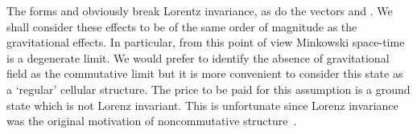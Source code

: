 \documentclass[a4paper,12pt]{article}
\def\h#1{\hat #1}
\begin{document}
The forms \coordHE{} and \myHighlight{$\h{K}_{ab}$}\coordHE{} obviously break Lorentz
invariance, as do the vectors \coordHE{} and
\myHighlight{$\h{F}_a = \epsilon_{abcd} \h{F^}{bcd}$}\coordHE{}. We shall consider these
effects to be of the same order of magnitude as the gravitational
effects. In particular, from this point of view Minkowski space-time
is a degenerate limit. We would prefer to identify the absence of
gravitational field as the commutative limit but it is more convenient
to consider this state as a `regular' cellular structure. The price to
be paid for this assumption is a ground state which is not Lorenz
invariant. This is unfortunate since Lorenz invariance was the
original motivation of noncommutative structure~\cite{Sny47a}.


\setlength{\parskip}{5pt}


\end{document}
